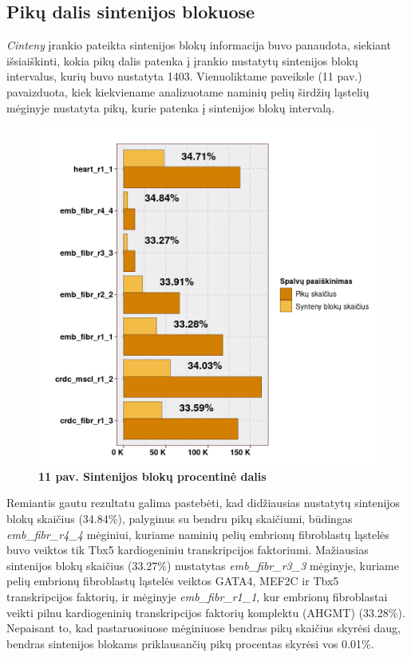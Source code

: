 \documentclass[12pt]{article}
\begin{document}
\newpage

\subsection{Pikų dalis sintenijos blokuose}
\emph{Cinteny} įrankio pateikta sintenijos blokų informacija buvo panaudota,
siekiant išsiaiškinti, kokia pikų dalis patenka į įrankio nustatytų sintenijos
blokų intervalus, kurių buvo nustatyta 1403. Vienuoliktame paveiksle (11 pav.)
pavaizduota, kiek kiekviename analizuotame naminių pelių širdžių ląstelių
mėginyje nustatyta pikų, kurie patenka į sintenijos blokų intervalą.

\begin{figure}[htb]
    \begin{center}
        \includegraphics[width=0.7\linewidth]{../Figures/Synteny_blocks_peaks.png}
        \vspace{-2\baselineskip}
        \caption*{\small\textbf{11 pav. Sintenijos blokų procentinė dalis}}
        \label{fig:birds}
    \end{center}
\end{figure}

Remiantis gautu rezultatu galima pastebėti, kad didžiausias nustatytų sintenijos
blokų skaičius (34.84\%), palyginus su bendru pikų skaičiumi, būdingas
\emph{emb\_fibr\_r4\_4} mėginiui, kuriame naminių pelių embrionų fibroblastų
ląstelės buvo veiktos tik Tbx5 kardiogeniniu transkripcijos faktoriumi.
Mažiausias sintenijos blokų skaičius (33.27\%) nustatytas
\emph{emb\_fibr\_r3\_3} mėginyje, kuriame pelių embrionų fibroblastų ląstelės
veiktos GATA4, MEF2C ir Tbx5 transkripcijos faktorių, ir mėginyje
\emph{emb\_fibr\_r1\_1}, kur embrionų fibroblastai veikti pilnu kardiogeninių
trans\-krip\-ci\-jos faktorių komplektu (AHGMT) (33.28\%). Nepaisant to, kad
pastaruosiuose mėginiuose bendras pikų skaičius skyrėsi daug, bendras sintenijos
blokams priklausančių pikų procentas skyrėsi vos 0.01\%.
\end{document}
